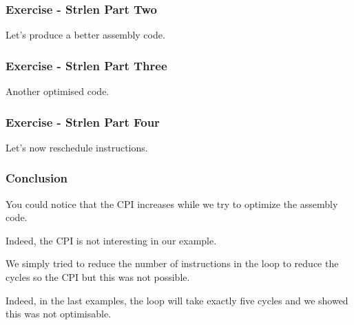 
\begin{frame}
  \frametitle{Exercise - Strlen Part Two}

  Let's produce a better assembly code.

  \begin{center}
  \end{center}
\end{frame}


\begin{frame}
  \frametitle{Exercise - Strlen Part Three}

  Another optimised code.

  \begin{center}
  \end{center}
\end{frame}


\begin{frame}
  \frametitle{Exercise - Strlen Part Four}

  Let's now reschedule instructions.

  \begin{center}
  \end{center}
\end{frame}


\begin{frame}
  \frametitle{Conclusion}

  You could notice that the CPI increases while we try to
  optimize the assembly code.

  \nl

  Indeed, the CPI is not interesting in our example.

  \nl

  We simply tried to reduce the number of instructions in the loop
  to reduce the cycles so the CPI but this was not possible.

  \nl

  Indeed, in the last examples, the loop will take exactly five cycles
  and we showed this was not optimisable.
\end{frame}


